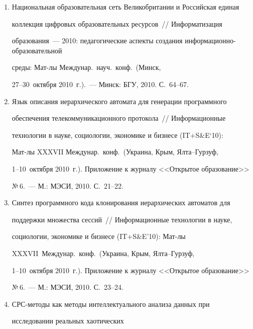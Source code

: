   \begin{enumerate}[1.]


\item {}


Национальная образовательная сеть Великобритании и Российская единая 


коллекция цифровых образовательных ресурсов~/\!\!/  Информатизация 


образования~--- 2010: педагогические аспекты создания ин\-фор\-ма\-ци\-он\-но-образовательной 


среды: Мат-лы Междунар.\ науч.\ конф.\ (Минск, 


27--30~октября 2010~г.).~--- Минск: БГУ, 2010. С.~64--67.


\item {}


Язык описания иерархического автомата для генерации программного 


обеспечения телекоммуникационного протокола~/\!\!/  Информационные 


технологии в науке, социологии, экономике и бизнесе (IT\;+\;S\&E`10): 


Мат-лы XXXVII Междунар.\ конф.\ (Украина, Крым, Ялта--Гурзуф, 


1--10~октября 2010~г.). Приложение к журналу <<Открытое образование>> 


№\,6.~--- М.: МЭСИ, 2010. С.~21--22.


\item {}


Синтез программного кода клонирования иерархических автоматов для 


поддержки множества сессий~/\!\!/  Информационные технологии в науке, 


социологии, экономике и бизнесе (IT\;+\;S\&E'10): Мат-лы 


XXXVII~Междунар.\ конф.\ (Украина, Крым, Ялта--Гурзуф, 


1--10~октября 2010~г.). Приложение к журналу <<Открытое образование>> 


№\,6.~--- М.: МЭСИ, 2010. С.~23--24.


\item {}


СРС-ме\-то\-ды как методы интеллектуального анализа данных при 


исследовании реальных хаотических\linebreak\vspace*{-12pt}






\end{enumerate}
